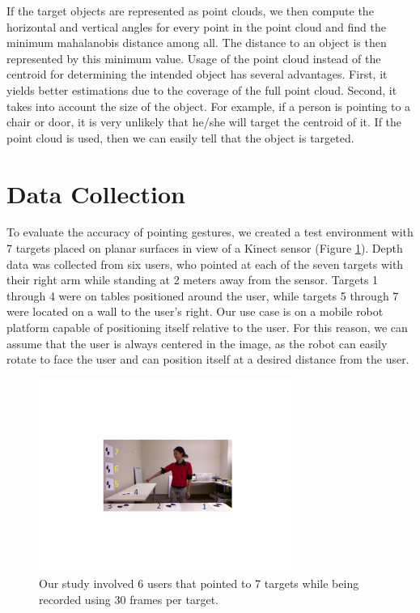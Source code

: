 \documentclass[12pt]{gatech-thesis}
\begin{document}
If the target objects are represented as point clouds, we then compute the horizontal and vertical angles for every point in the point cloud and find the minimum mahalanobis distance among all. The distance to an object is then represented by this minimum value. Usage of the point cloud instead of the centroid for determining the intended object has several advantages. First, it yields better estimations due to the coverage of the full point cloud. Second, it takes into account the size of the object. For example, if a person is pointing to a chair or door, it is very unlikely that he/she will target the centroid of it. If the point cloud is used, then we can easily tell that the object is targeted.

 
\section{Data Collection}
\label{sec:pointing_data_collection}

To evaluate the accuracy of pointing gestures, we created a test environment with 7 targets placed on planar surfaces in view of a Kinect sensor (Figure \ref{fig:ground_truth_targets}). Depth data was collected from six users, who pointed at each of the seven targets with their right arm while standing at 2 meters away from the sensor. Targets 1 through 4 were on tables positioned around the user, while targets 5 through 7 were located on a wall to the user's right. Our use case is on a mobile robot platform capable of positioning itself relative to the user.  For this reason, we can assume that the user is always centered in the image, as the robot can easily rotate to face the user and can position itself at a desired distance from the user.

\begin{figure}[ht!]
\centering
\includegraphics[width=0.75\textwidth]{pics/data_collection_crop}
\caption{Our study involved 6 users that pointed to 7 targets while being recorded using 30 frames per target.}
\label{fig:ground_truth_targets}
\end{figure}
\end{document}
